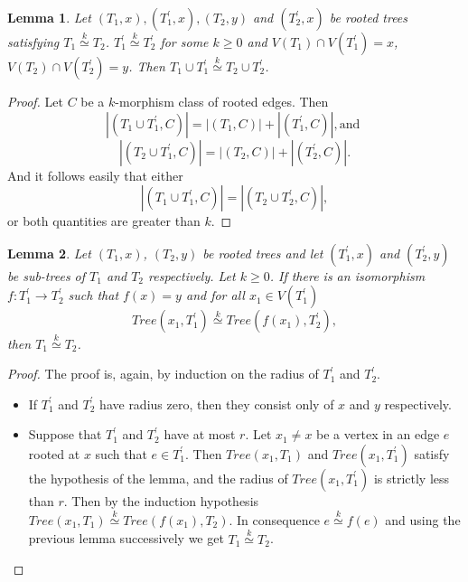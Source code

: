 \documentclass[11pt,notitlepage]{report}
\newtheorem{lemma}{Lemma}[chapter]
\theoremstyle{definition}
\newcommand{\morph}[1]{\stackrel{#1}{\simeq}}
\begin{document}
\begin{lemma}
	Let $(T_1,x),(T^\prime_1,x), (T_2, y)$ and $(T^\prime_2,x)$ 
	be rooted trees satisfying $T_1\morph{k} T_2$.
	$T_1^\prime\morph{k} T_2^\prime$ for some 
	$k\geq 0$ and $V(T_1)\cap V(T_1^\prime)=x$, 
	$V(T_2)\cap V(T_2^\prime)=y$. Then
	$T_1\cup T_1^\prime \morph{k} T_2\cup T_2^\prime$.
\end{lemma}
\begin{proof}
	Let $C$ be a $k$-morphism class of rooted edges. Then
	\[|(T_1\cup T_1^\prime,C)|= |(T_1,C)|+ |(T_1^\prime,C)|, \text{and }\]
	\[|(T_2\cup T_1^\prime,C)|= |(T_2,C)|+ |(T_2^\prime,C)|.\]
	And it follows easily that either
	\[|(T_1\cup T_1^\prime,C)|=|(T_2\cup T_2^\prime,C)|,\]
	or both quantities are greater than $k$. 
\end{proof}


\begin{lemma} 
	Let $(T_1,x)$, $(T_2, y)$ be rooted trees and let 
	$(T^\prime_1,x)$ and $(T^\prime_2,y)$ be sub-trees of 
	$T_1$ and $T_2$ respectively. Let $k\geq 0$.
	If there is an isomorphism 
	$f:T^\prime_1 \rightarrow T^\prime_2$ such that $f(x)=y$ and
	for all $x_1\in V(T^\prime_1)$
	\[ Tree(x_1,T^\prime_1)\morph{k} Tree(f(x_1),T^\prime_2),\]
	then $T_1\morph{k}T_2$. 
\end{lemma}
\begin{proof}
	The proof is, again, by induction on the radius of $T^\prime_1$ and $T^\prime_2$.
	\begin{itemize}
		\item If $T^\prime_1$ and $T^\prime_2$ have radius zero, then they consist only of
		$x$ and $y$ respectively. 
		\item Suppose that $T^\prime_1$ and $T^\prime_2$ have at most $r$. Let $x_1\neq x$ be
		a vertex in an edge $e$ rooted at $x$ such that $e\in T^\prime_1$.
		Then $Tree(x_1, T_1)$ and $Tree(x_1,T^\prime_1)$ satisfy the hypothesis of the lemma,
		and the radius of $Tree(x_1,T^\prime_1)$ is strictly less than $r$. Then by the induction
		hypothesis $Tree(x_1, T_1)\morph{k} Tree(f(x_1),T_2)$. In consequence $e\morph{k}f(e)$
		and using the previous lemma successively we get $T_1\morph{k} T_2$.
	\end{itemize}
\end{proof}
\end{document}
